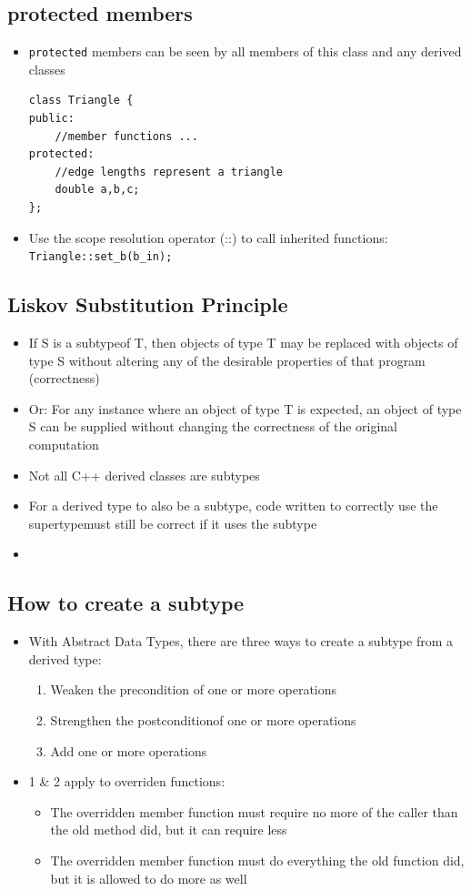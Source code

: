 \subsection{protected members}
\begin{itemize}
	\item \lstinline[style=C++]{protected} members can be seen by all members of this class and any derived classes
\begin{lstlisting}[style=C++]
class Triangle {
public:
	//member functions ...
protected:
	//edge lengths represent a triangle
	double a,b,c;
};
\end{lstlisting}
	\item Use the scope resolution operator (::) to call inherited functions: \lstinline[style=C++]{Triangle::set_b(b_in);}
\end{itemize}

\subsection{Liskov Substitution Principle}
\begin{itemize}
	\item If S is a subtypeof T, then objects of type T may be replaced with objects of type S without altering any of the desirable properties of that program (correctness)
	\item Or: For any instance where an object of type T is expected, an object of type S can be supplied without changing the correctness of the original computation
	\item Not all C++ derived classes are subtypes
	\item For a derived type to also be a subtype, code written to correctly use the supertypemust still be correct if it uses the subtype
	\item 
\end{itemize}

\subsection{How to create a subtype}
\begin{itemize}
	\item With Abstract Data Types, there are three ways to create a subtype from a derived type:
	\begin{enumerate}
		\item Weaken the precondition of one or more operations
		\item Strengthen the postconditionof one or more operations
		\item Add one or more operations
	\end{enumerate}
	\item 1 \& 2 apply to overriden functions:
	\begin{itemize}
		\item The overridden member function must require no more of the caller than the old method did, but it can require less
		\item The overridden member function must do everything the old function did, but it is allowed to do more as well
	\end{itemize}
\end{itemize}

